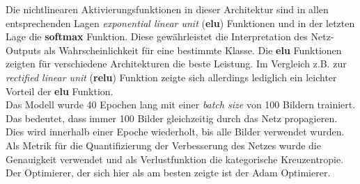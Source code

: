 Die nichtlinearen Aktivierungsfunktionen in dieser Architektur sind in allen
entsprechenden Lagen \textit{exponential linear unit} (\textbf{elu}) Funktionen und in der letzten Lage die
\textbf{softmax} Funktion. Diese gewährleistet die Interpretation des
Netz-Outputs als Wahrscheinlichkeit für eine bestimmte Klasse.
Die \textbf{elu} Funktionen zeigten für verschiedene Architekturen die beste
Leistung. Im Vergleich z.B. zur \textit{rectified linear unit} (\textbf{relu}) Funktion zeigte sich allerdings
lediglich ein leichter Vorteil der \textbf{elu} Funktion.\\
Das Modell wurde 40 Epochen lang mit einer \textit{batch size} von 100 Bildern
trainiert. Das bedeutet, dass immer 100 Bilder gleichzeitig durch das Netz
propagieren. Dies wird innerhalb einer Epoche wiederholt, bis alle Bilder
verwendet wurden. Als Metrik für die Quantifizierung der Verbesserung des
Netzes wurde die Genauigkeit verwendet und als Verlustfunktion die
kategorische Kreuzentropie. Der Optimierer, der sich hier als am besten zeigte
ist der Adam Optimierer.

